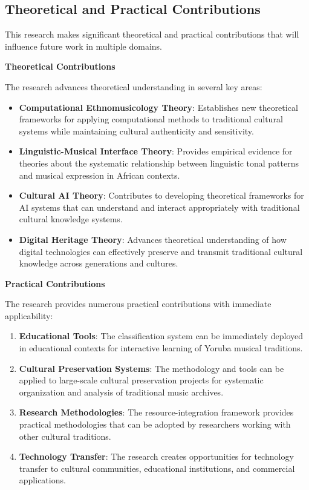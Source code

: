 \documentclass[12pt,a4paper]{article}
\begin{document}
\subsection{Theoretical and Practical Contributions}

This research makes significant theoretical and practical contributions that will influence future work in multiple domains.

\textbf{Theoretical Contributions}

The research advances theoretical understanding in several key areas:

\begin{itemize}
\item \textbf{Computational Ethnomusicology Theory}: Establishes new theoretical frameworks for applying computational methods to traditional cultural systems while maintaining cultural authenticity and sensitivity.
\item \textbf{Linguistic-Musical Interface Theory}: Provides empirical evidence for theories about the systematic relationship between linguistic tonal patterns and musical expression in African contexts.
\item \textbf{Cultural AI Theory}: Contributes to developing theoretical frameworks for AI systems that can understand and interact appropriately with traditional cultural knowledge systems.
\item \textbf{Digital Heritage Theory}: Advances theoretical understanding of how digital technologies can effectively preserve and transmit traditional cultural knowledge across generations and cultures.
\end{itemize}

\textbf{Practical Contributions}

The research provides numerous practical contributions with immediate applicability:

\begin{enumerate}
\item \textbf{Educational Tools}: The classification system can be immediately deployed in educational contexts for interactive learning of Yoruba musical traditions.
\item \textbf{Cultural Preservation Systems}: The methodology and tools can be applied to large-scale cultural preservation projects for systematic organization and analysis of traditional music archives.
\item \textbf{Research Methodologies}: The resource-integration framework provides practical methodologies that can be adopted by researchers working with other cultural traditions.
\item \textbf{Technology Transfer}: The research creates opportunities for technology transfer to cultural communities, educational institutions, and commercial applications.
\end{enumerate}
\end{document}
